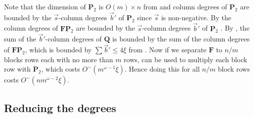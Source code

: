 \begin{pf}
Note that the dimension of $\mathbf{P}_{2}$ is $O(m)\times n$ from
and column
degrees of $\mathbf{P}_{2}$ are bounded by the $\vec{s}$-column
degrees $\vec{b}'$ of $\mathbf{P}_{2}$ since $\vec{s}$ is non-negative.
By  the column degrees of $\mathbf{F}\mathbf{P}_{2}$
are bounded by the $\vec{s}$-column degrees $\vec{b}'$ of $\mathbf{P}_{2}$
. By ,
the sum of the $\vec{b}'$-column degrees of $\mathbf{Q}$ is bounded
by the sum of the column degrees of $\mathbf{F}\mathbf{P}_{2}$, which
is bounded by $\sum\vec{b}'\le4\xi$ from .
Now if we separate $\mathbf{F}$ to $n/m$ blocks rows each with no
more than $m$ rows,  can
be used to multiply each block row with $\mathbf{P}_{2}$, which costs
$O^{\sim}(m^{\omega-1}\xi)$. Hence doing this for all $n/m$ block
rows costs $O^{\sim}\left(nm^{\omega-2}\xi\right)$.
\end{pf}

\subsection{Reducing the degrees}

